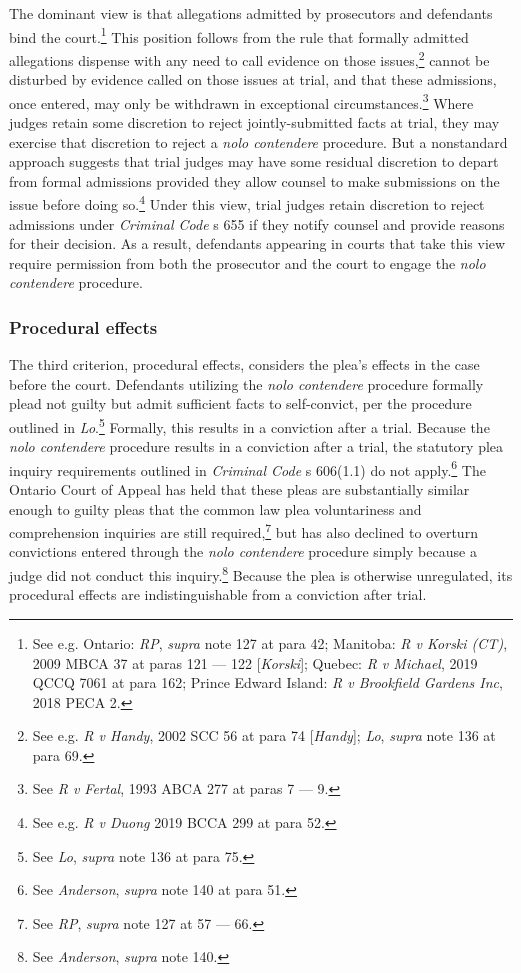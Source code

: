 The dominant view is that allegations admitted by prosecutors and defendants bind the court.\footnote{See e.g. Ontario: \textit{RP}, \textit{supra} note 127 at para 42; Manitoba: \textit{R v Korski (CT)}, 2009 MBCA 37 at paras 121 — 122 [\textit{Korski}]; Quebec: \textit{R v Michael}, 2019 QCCQ 7061 at para 162; Prince Edward Island: \textit{R v Brookfield Gardens Inc}, 2018 PECA 2.} This position follows from the rule that formally admitted allegations dispense with any need to call evidence on those issues,\footnote{See e.g. \textit{R v Handy}, 2002 SCC 56 at para 74 [\textit{Handy}]; \textit{Lo}, \textit{supra} note 136 at para 69.} cannot be disturbed by evidence called on those issues at trial, and that these admissions, once entered, may only be withdrawn in exceptional circumstances.\footnote{See \textit{R v Fertal}, 1993 ABCA 277 at paras 7 — 9.} Where judges retain some discretion to reject jointly-submitted facts at trial, they may exercise that discretion to reject a \textit{nolo contendere} procedure. But a nonstandard approach suggests that trial judges may have some residual discretion to depart from formal admissions provided they allow counsel to make submissions on the issue before doing so.\footnote{See e.g. \textit{R v Duong} 2019 BCCA 299 at para 52.} Under this view, trial judges retain discretion to reject admissions under \textit{Criminal Code} s 655 if they notify counsel and provide reasons for their decision. As a result, defendants appearing in courts that take this view require permission from both the prosecutor and the court to engage the \textit{nolo contendere} procedure.

\subsubsection{Procedural effects}

The third criterion, procedural effects, considers the plea's effects in the case before the court. Defendants utilizing the \textit{nolo contendere} procedure formally plead not guilty but admit sufficient facts to self-convict, per the procedure outlined in \textit{Lo}.\footnote{See \textit{Lo}, \textit{supra} note 136 at para 75.} Formally, this results in a conviction after a trial. Because the \textit{nolo contendere} procedure results in a conviction after a trial, the statutory plea inquiry requirements outlined in \textit{Criminal Code} s 606(1.1) do not apply.\footnote{See \textit{Anderson}, \textit{supra} note 140 at para 51.} The Ontario Court of Appeal has held that these pleas are substantially similar enough to guilty pleas that the common law plea voluntariness and comprehension inquiries are still required,\footnote{See \textit{RP}, \textit{supra} note 127 at 57 — 66.} but has also declined to overturn convictions entered through the \textit{nolo contendere} procedure simply because a judge did not conduct this inquiry.\footnote{See \textit{Anderson}, \textit{supra} note 140.} Because the plea is otherwise unregulated, its procedural effects are indistinguishable from a conviction after trial.

